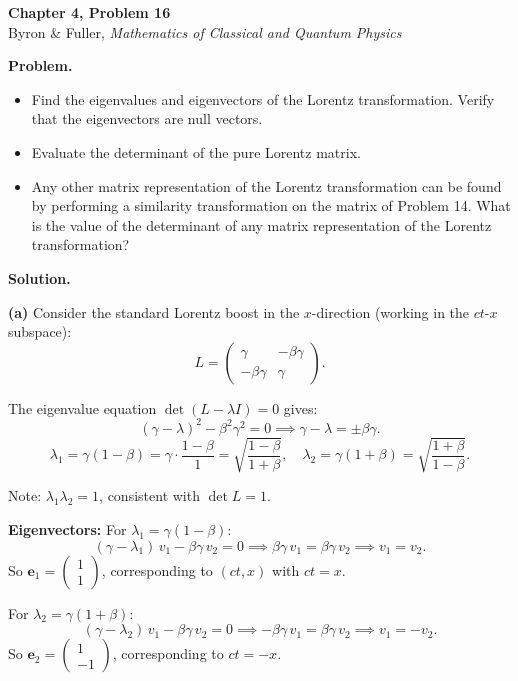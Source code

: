 \documentclass[12pt]{article}
\begin{document}
\begin{center}
{\Large\bfseries Chapter 4, Problem 16}\\[6pt]
Byron \& Fuller, \textit{Mathematics of Classical and Quantum Physics}
\end{center}

\bigskip

\textbf{Problem.}
\begin{itemize}
\item[(a)] Find the eigenvalues and eigenvectors of the Lorentz transformation. Verify that the eigenvectors are null vectors.
\item[(b)] Evaluate the determinant of the pure Lorentz matrix.
\item[(c)] Any other matrix representation of the Lorentz transformation can be found by performing a similarity transformation on the matrix of Problem 14. What is the value of the determinant of any matrix representation of the Lorentz transformation?
\end{itemize}

\bigskip
\textbf{Solution.}

\textbf{(a)} Consider the standard Lorentz boost in the $x$-direction (working in the $ct$-$x$ subspace):
\[
L = \begin{pmatrix} \gamma & -\beta\gamma \\ -\beta\gamma & \gamma \end{pmatrix}.
\]

The eigenvalue equation $\det(L - \lambda I) = 0$ gives:
\[
(\gamma - \lambda)^2 - \beta^2\gamma^2 = 0 \implies \gamma - \lambda = \pm\beta\gamma.
\]
\[
\lambda_1 = \gamma(1-\beta) = \gamma\cdot\frac{1-\beta}{1} = \sqrt{\frac{1-\beta}{1+\beta}}, \quad \lambda_2 = \gamma(1+\beta) = \sqrt{\frac{1+\beta}{1-\beta}}.
\]

Note: $\lambda_1\lambda_2 = 1$, consistent with $\det L = 1$.

\textbf{Eigenvectors:} For $\lambda_1 = \gamma(1-\beta)$:
\[
(\gamma - \lambda_1)\,v_1 - \beta\gamma\,v_2 = 0 \implies \beta\gamma\,v_1 = \beta\gamma\,v_2 \implies v_1 = v_2.
\]
So $\mathbf{e}_1 = \begin{pmatrix} 1 \\ 1 \end{pmatrix}$, corresponding to $(ct, x)$ with $ct = x$.

For $\lambda_2 = \gamma(1+\beta)$:
\[
(\gamma - \lambda_2)\,v_1 - \beta\gamma\,v_2 = 0 \implies -\beta\gamma\,v_1 = \beta\gamma\,v_2 \implies v_1 = -v_2.
\]
So $\mathbf{e}_2 = \begin{pmatrix} 1 \\ -1 \end{pmatrix}$, corresponding to $ct = -x$.
\end{document}
